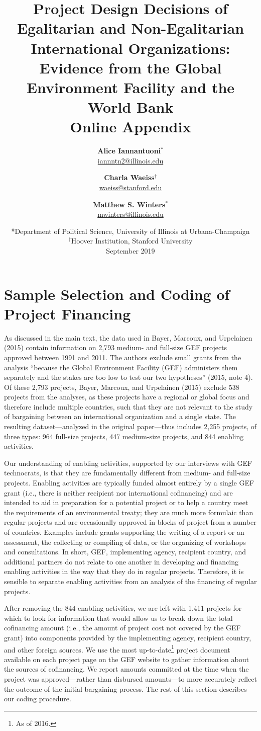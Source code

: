 \documentclass{article}
\title{Project Design Decisions of Egalitarian and Non-Egalitarian International Organizations: Evidence from the Global Environment Facility and the World Bank \\ \textbf{Online Appendix} \\[2ex]}
\author{\textbf{Alice Iannantuoni}$^*$ \\ \href{mailto:iannntn2@illinois.edu}{iannntn2@illinois.edu} \and \textbf{Charla Waeiss}$^\dagger$ \\ \href{mailto:waeiss@stanford.edu}{waeiss@stanford.edu} \and \textbf{Matthew S. Winters}$^*$ \\ \href{mailto:mwinters@illinois.edu}{mwinters@illinois.edu}}
\date{%
	*Department of Political Science, University of Illinois at Urbana-Champaign\\
	$^\dagger$Hoover Institution, Stanford University\\[4ex]%
	September 2019
}
\begin{document}
	
\maketitle

\doublespacing 

\section{Sample Selection and Coding of Project Financing}
As discussed in the main text, the data used in Bayer, Marcoux, and Urpelainen (2015) contain information on 2,793 medium- and full-size GEF projects approved between 1991 and 2011. The authors exclude small grants from the analysis “because the Global Environment Facility (GEF) administers them separately and the stakes are too low to test our two hypotheses” (2015, note 4). Of these 2,793 projects, Bayer, Marcoux, and Urpelainen (2015) exclude 538 projects from the analyses, as these projects have a regional or global focus and therefore include multiple countries, such that they are not relevant to the study of bargaining between an international organization and a single state. The resulting dataset---analyzed in the original paper---thus includes 2,255 projects, of three types: 964 full-size projects, 447 medium-size projects, and 844 enabling activities. 

Our understanding of enabling activities, supported by our interviews with GEF technocrats, is that they are fundamentally different from medium- and full-size projects. Enabling activities are typically funded almost entirely by a single GEF grant (i.e., there is neither recipient nor international cofinancing) and are intended to aid in preparation for a potential project or to help a country meet the requirements of an environmental treaty; they are much more formulaic than regular projects and are occasionally approved in blocks of project from a number of countries. Examples include grants supporting the writing of a report or an assessment, the collecting or compiling of data, or the organizing of workshops and consultations. In short, GEF, implementing agency, recipient country, and additional partners do not relate to one another in developing and financing enabling activities in the way that they do in regular projects. Therefore, it is sensible to separate enabling activities from an analysis of the financing of regular projects. 

After removing the 844 enabling activities, we are left with 1,411 projects for which to look for information that would allow us to break down the total cofinancing amount (i.e., the amount of project cost not covered by the GEF grant) into components provided by the implementing agency, recipient country, and other foreign sources. We use the most up-to-date\footnote{As of 2016.}  project document available on each project page on the GEF website to gather information about the sources of cofinancing.  We report amounts committed at the time when the project was approved---rather than disbursed amounts---to more accurately reflect the outcome of the initial bargaining process. The rest of this section describes our coding procedure. 
\end{document}
